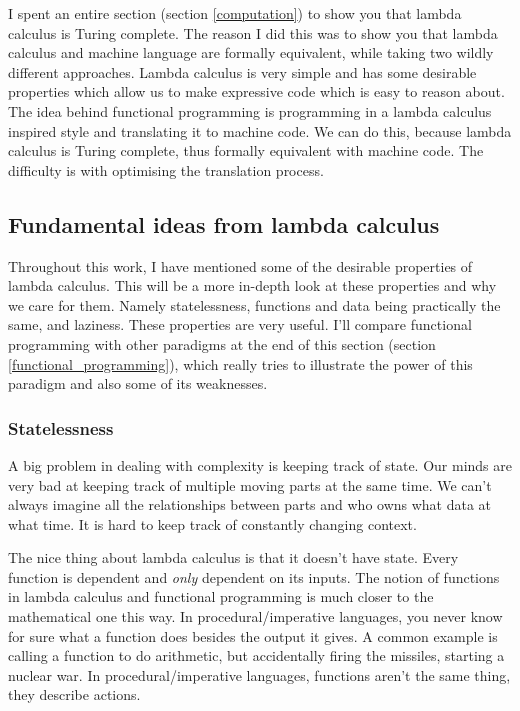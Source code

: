 \documentclass[11pt]{article}
\begin{document}
I spent an entire section (section \ref{computation}) to show you that lambda
calculus is Turing complete. The reason I did this was to show you that lambda
calculus and machine language are formally equivalent, while taking two wildly
different approaches. Lambda calculus is very simple and has some desirable
properties which allow us to make expressive code which is easy to reason
about. The idea behind functional programming is programming in a lambda
calculus inspired style and translating it to machine code. We can do this,
because lambda calculus is Turing complete, thus formally equivalent with
machine code. The difficulty is with optimising the translation process.

\subsection{Fundamental ideas from lambda calculus}

Throughout this work, I have mentioned some of the desirable properties of
lambda calculus. This will be a more in-depth look at these properties and why
we care for them. Namely statelessness, functions and data being practically
the same, and laziness. These properties are very useful. I'll compare
functional programming with other paradigms at the end of this section (section
\ref{functional_programming}), which really tries to illustrate the power of
this paradigm and also some of its weaknesses.

\subsubsection{Statelessness}\label{statelessness}

A big problem in dealing with complexity is keeping track of state. Our minds
are very bad at keeping track of multiple moving parts at the same time. We
can't always imagine all the relationships between parts and who owns what data
at what time. It is hard to keep track of constantly changing context.

The nice thing about lambda calculus is that it doesn't have state. Every
function is dependent and \emph{only} dependent on its inputs. The notion of
functions in lambda calculus and functional programming is much closer to the
mathematical one this way. In procedural/imperative languages, you never know
for sure what a function does besides the output it gives. A common example is
calling a function to do arithmetic, but accidentally firing the missiles,
starting a nuclear war. In procedural/imperative languages, functions aren't
the same thing, they describe actions.
\end{document}
